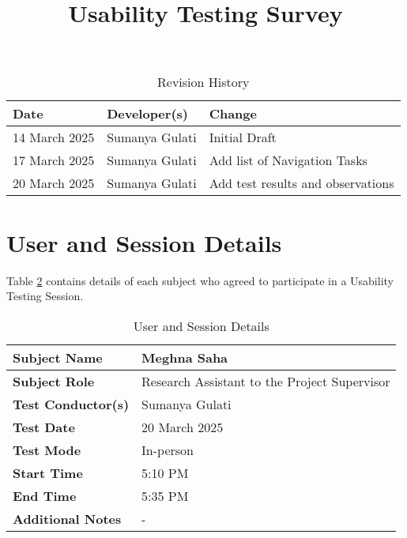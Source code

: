 \documentclass{article}
\title{Usability Testing Survey\\\progname}
\author{\authname}
\date{}
\begin{document}
\maketitle

\begin{table}[hp]
\caption{Revision History} \label{TblRevisionHistory}
\begin{tabularx}{\textwidth}{llX}
\toprule
\textbf{Date} & \textbf{Developer(s)} & \textbf{Change}\\
\midrule
14 March 2025 & Sumanya Gulati & Initial Draft\\
17 March 2025  & Sumanya Gulati & Add list of Navigation Tasks\\
20 March 2025 & Sumanya Gulati & Add test results and observations\\
\bottomrule
\end{tabularx}
\end{table}

\newpage
\section{User and Session Details}
Table \ref{UserDetails} contains details of each subject who agreed to participate in a 
Usability Testing Session.
\begin{table}[hp]
\begin{tabularx}{\textwidth}{l | X}
\toprule
\textbf{Subject Name} & Meghna Saha \\
\midrule
\textbf{Subject Role} & Research Assistant to the Project Supervisor \\
\midrule
\textbf{Test Conductor(s)} & Sumanya Gulati \\
\midrule
\textbf{Test Date} & 20 March 2025 \\
\midrule
\textbf{Test Mode} & In-person \\
\midrule
\textbf{Start Time} & 5:10 PM \\
\midrule
\textbf{End Time} & 5:35 PM \\
\midrule
\textbf{Additional Notes} & - \\
\bottomrule
\end{tabularx}
\caption{User and Session Details} \label{UserDetails}
\end{table}
\end{document}
